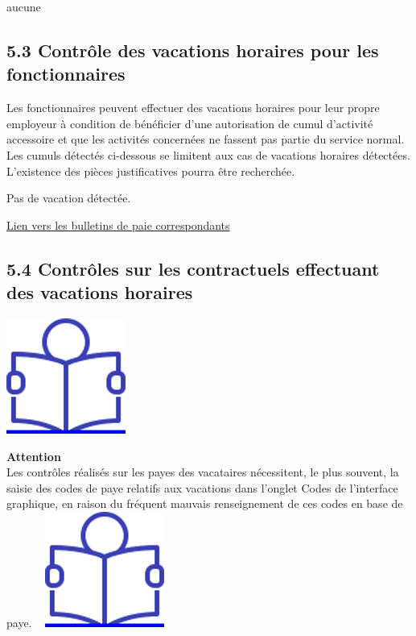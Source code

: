 aucune

\hypertarget{controle-des-vacations-horaires-pour-les-fonctionnaires}{%
\subsection{5.3 Contrôle des vacations horaires pour les
fonctionnaires}\label{controle-des-vacations-horaires-pour-les-fonctionnaires}}

Les fonctionnaires peuvent effectuer des vacations horaires pour leur
propre employeur à condition de bénéficier d'une autorisation de cumul
d'activité accessoire et que les activités concernées ne fassent pas
partie du service normal. Les cumuls détectés ci-dessous se limitent aux
cas de vacations horaires détectées. L'existence des pièces
justificatives pourra être recherchée.

Pas de vacation détectée.

\href{../Bases/Reglementation/Paie_vac_fonct.csv}{Lien vers les bulletins
de paie correspondants}

\hypertarget{controles-sur-les-contractuels-effectuant-des-vacations-horaires}{%
\subsection{5.4 Contrôles sur les contractuels effectuant des vacations
horaires}\label{controles-sur-les-contractuels-effectuant-des-vacations-horaires}}

\href{../Docs/Notices/fiche_CEV_droit.odt}{\includegraphics{icones/Notice.png}}

\textbf{Attention}\\
Les contrôles réalisés sur les payes des vacataires nécessitent, le plus
souvent, la saisie des codes de paye relatifs aux vacations dans
l'onglet Codes de l'interface graphique, en raison du fréquent mauvais
renseignement de ces codes en base de paye. ~
\href{../Docs/Notices/fiche_onglet_codes.odt}{\includegraphics{icones/Notice.png}}

